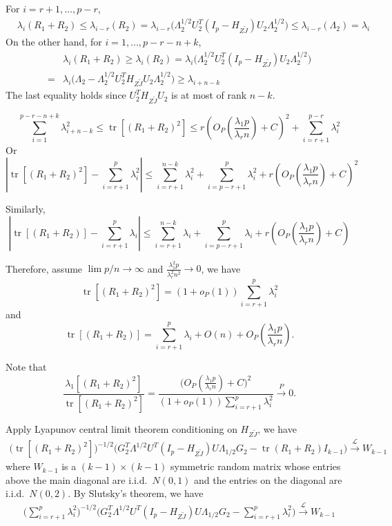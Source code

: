 \documentclass[review]{elsarticle}
\DeclareMathOperator{\mytr}{tr}
\theoremstyle{plain}
\theoremstyle{definition}
\theoremstyle{remark}
\begin{document}
For $i=r+1,\ldots, p-r$,
$$
\begin{aligned}
    &\lambda_i(R_1+R_2)\leq \lambda_{i-r}(R_2)
    =
     \lambda_{i-r}\big( \Lambda_2^{1/2} U_2^T (I_p-H_{Z\tilde{J}})U_2\Lambda_2^{1/2}\big)
    \leq
    \lambda_{i-r}(\Lambda_2)
    =\lambda_i
\end{aligned}
$$
On the other hand,
for $i=1,\ldots, p-r-n+k$,
$$
\begin{aligned}
    &\lambda_i(R_1+R_2)\geq \lambda_i(R_2)
    =
     \lambda_i\big( \Lambda_2^{1/2} U_2^T (I_p-H_{Z\tilde{J}})U_2\Lambda_2^{1/2}\big)\\
    =&
    \lambda_i\big( \Lambda_2- \Lambda_2^{1/2} U_2^T H_{Z\tilde{J}}U_2 \Lambda_2^{1/2}\big)
    \geq 
    \lambda_{i+n-k}
\end{aligned}
$$
The last equality holds since $U_2^T H_{Z\tilde{J}}U_2$ is at most of rank $n-k$.


$$
    \sum_{i=1}^{p-r-n+k}\lambda_{i+n-k}^2\leq \mytr [(R_1+R_2)^2]\leq  r(O_P(\frac{\lambda_1 p}{\lambda_r n})+C)^2+\sum_{i=r+1}^{p-r}\lambda_i^2
$$
Or
$$
    | \mytr [(R_1+R_2)^2]-\sum_{i=r+1}^{p}\lambda_{i}^2|\leq 
\sum_{i=r+1}^{n-k}\lambda_{i}^2+
\sum_{i=p-r+1}^{p}\lambda_{i}^2
+
    r(O_P(\frac{\lambda_1 p}{\lambda_r n})+C)^2
$$

Similarly,
$$
    | \mytr [(R_1+R_2)]-\sum_{i=r+1}^{p}\lambda_{i}|\leq 
\sum_{i=r+1}^{n-k}\lambda_{i}+
\sum_{i=p-r+1}^{p}\lambda_{i}
+
    r(O_P(\frac{\lambda_1 p}{\lambda_r n})+C)
$$

Therefore, assume $\lim p/n \to \infty$ and $\frac{\lambda_1^2 p}{\lambda_r^2 n^2}\to 0$, we have
$$
     \mytr [(R_1+R_2)^2]=(1+o_P(1))\sum_{i=r+1}^{p}\lambda_{i}^2
$$
and
$$
     \mytr [(R_1+R_2)]=\sum_{i=r+1}^{p}\lambda_{i}+O(n)+O_P(\frac{\lambda_1 p}{\lambda_r n}).
$$

Note that
$$
\frac{\lambda_1[(R_1+R_2)^2]}{
    \mytr [(R_1+R_2)^2]
}
=
\frac{
    \big( O_P(\frac{\lambda_1 p}{\lambda_r n})+C\big)^2
}{
(1+o_P(1))\sum_{i=r+1}^{p}\lambda_{i}^2
}
\xrightarrow{P} 0.
$$

Apply Lyapunov central limit theorem conditioning on $H_{Z\tilde{J}}$, we have
$$
\begin{aligned}
    \big(\mytr[(R_1+R_2)^2]\big)^{-1/2}
    \big( G_2^T \Lambda^{1/2}U^T (I_p-H_{Z\tilde{J}})U\Lambda_{1/2}G_2-\mytr(R_1+R_2) I_{k-1} \big)
    \xrightarrow{\mathcal{L}} W_{k-1}
\end{aligned}
$$
where $W_{k-1}$ is a $(k-1)\times(k-1)$ symmetric random matrix whose entries above the main diagonal are i.i.d.\ $N(0,1)$ and the entries on the diagonal are i.i.d.\ $N(0,2)$.
By Slutsky's theorem, we have
$$
\begin{aligned}
    \big(\sum_{i=r+1}^p \lambda_i^2\big)^{-1/2}
    \big( G_2^T \Lambda^{1/2}U^T (I_p-H_{Z\tilde{J}})U\Lambda_{1/2}G_2-\sum_{i=r+1}^p \lambda_i^2 \big)
    \xrightarrow{\mathcal{L}}W_{k-1}
\end{aligned}
$$
\end{document}
